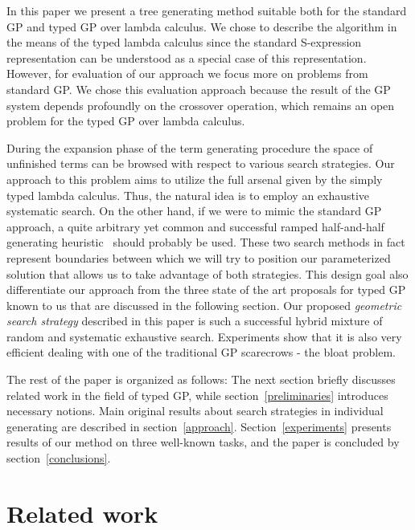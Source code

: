 \documentclass[conference]{IEEEtran}
\newcommand{\red}[1]{{\color{red} #1}}
\begin{document}
\red{In this paper we present a tree generating method suitable both for the standard GP\cite{koza92} and  typed GP over lambda calculus. We chose to describe the algorithm in the means of the typed lambda calculus since the standard S-expression representation can be understood as a special case of this representation. However, for evaluation of our approach we focus more on problems from standard GP. We chose this evaluation approach because the result of the GP system depends profoundly on the crossover operation, which remains an open problem for the typed GP over lambda calculus.
  }

During the expansion phase \red{of the term generating procedure} the \red{space} 
of unfinished terms can be browsed with respect to various search strategies. Our approach to this problem aims to utilize the full arsenal given by the simply typed lambda calculus. Thus, the natural idea is to employ an exhaustive systematic search. On the other hand, if we were to mimic the standard GP approach, a quite arbitrary yet common and successful ramped half-and-half generating heuristic~\cite{fg} should probably be used.  
These two search methods in fact represent boundaries between which we will try to position our parameterized solution that allows us to take advantage of both strategies. This design goal also differentiate our approach from 
the three state of the art proposals for typed GP known to us that are discussed in the following section. 
Our proposed \emph{geometric
search strategy} described in this paper is such a successful hybrid mixture of random and systematic exhaustive search. Experiments show that it is also very efficient dealing with one of the traditional GP scarecrows - the bloat problem.

The rest of the paper is organized as follows: The next section briefly discusses related work in the field of typed GP, while section~\ref{preliminaries} introduces necessary notions. Main original results about search strategies in individual generating are described in section~\ref{approach}. Section~\ref{experiments} presents results of our method on three well-known tasks, and the paper is concluded by section~\ref{conclusions}.

\section{Related work}
\label{related}
\end{document}
